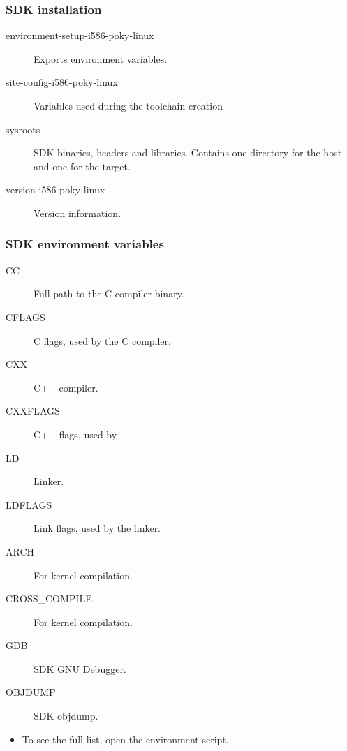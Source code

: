 \begin{frame}
  \frametitle{SDK installation}
  \begin{description}
    \item[environment-setup-i586-poky-linux] Exports environment
      variables.
    \item[site-config-i586-poky-linux] Variables used during the
      toolchain creation
    \item[sysroots] SDK binaries, headers and libraries. Contains
      one directory for the host and one for the target.
    \item[version-i586-poky-linux] Version information.
  \end{description}
\end{frame}

\begin{frame}
  \frametitle{SDK environment variables}
  \begin{description}
    \item[CC] Full path to the C compiler binary.
    \item[CFLAGS] C flags, used by the C compiler.
    \item[CXX] C++ compiler.
    \item[CXXFLAGS] C++ flags, used by 
    \item[LD] Linker.
    \item[LDFLAGS] Link flags, used by the linker.
    \item[ARCH] For kernel compilation.
    \item[CROSS\_COMPILE] For kernel compilation.
    \item[GDB] SDK GNU Debugger.
    \item[OBJDUMP] SDK objdump.
  \end{description}
  \begin{itemize}
    \item To see the full list, open the environment script.
  \end{itemize}
\end{frame}

